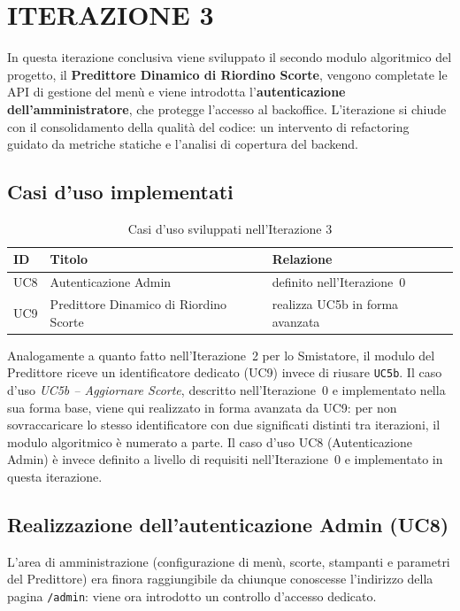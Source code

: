 \section{ITERAZIONE 3}

In questa iterazione conclusiva viene sviluppato il secondo modulo algoritmico del
progetto, il \textbf{Predittore Dinamico di Riordino Scorte}, vengono completate
le API di gestione del menù e viene introdotta l'\textbf{autenticazione
dell'amministratore}, che protegge l'accesso al backoffice. L'iterazione si chiude
con il consolidamento della qualità del codice: un intervento di refactoring
guidato da metriche statiche e l'analisi di copertura del backend.

\subsection{Casi d'uso implementati}

\begin{table}[H]
\centering
\caption{Casi d'uso sviluppati nell'Iterazione 3}
\label{tab:uc-iter3}
\begin{tabular}{lll}
\toprule
\textbf{ID} & \textbf{Titolo} & \textbf{Relazione} \\
\midrule
UC8 & Autenticazione Admin & definito nell'Iterazione~0 \\
UC9 & Predittore Dinamico di Riordino Scorte & realizza UC5b in forma avanzata \\
\bottomrule
\end{tabular}
\end{table}

Analogamente a quanto fatto nell'Iterazione~2 per lo Smistatore, il modulo del
Predittore riceve un identificatore dedicato (UC9) invece di riusare \texttt{UC5b}.
Il caso d'uso \emph{UC5b -- Aggiornare Scorte}, descritto nell'Iterazione~0 e
implementato nella sua forma base, viene qui realizzato in forma avanzata da UC9:
per non sovraccaricare lo stesso identificatore con due significati distinti tra
iterazioni, il modulo algoritmico è numerato a parte. Il caso d'uso UC8
(Autenticazione Admin) è invece definito a livello di requisiti nell'Iterazione~0
e implementato in questa iterazione.

\subsection{Realizzazione dell'autenticazione Admin (UC8)}
L'area di amministrazione (configurazione di
menù, scorte, stampanti e parametri del Predittore) era finora raggiungibile da
chiunque conoscesse l'indirizzo della pagina \texttt{/admin}: viene ora introdotto
un controllo d'accesso dedicato.
